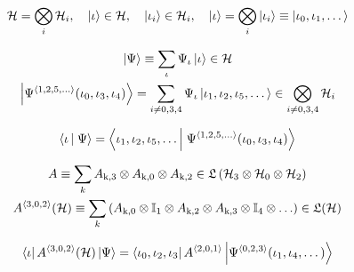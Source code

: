 \documentclass[a4paper,fleqn]{article}
\newcommand{\Lfrak}{\mathfrak{L}}
\newcommand\HSpace{{\mathcal H}}
\begin{document}
\begin{equation}
  \HSpace=\bigotimes_i\HSpace_i,\quad\ket\iota\in\HSpace,\quad\ket{\iota_i}\in\HSpace_i,
  \quad\ket\iota=\bigotimes_i\ket{\iota_i}\equiv\ket{\iota_0,\iota_1,\dots}
\end{equation}

\newpage

\begin{multline}
\ket\Psi\equiv\sum_\iota\Psi_\iota\ket\iota\in\HSpace\\
\ket{\Psi^{\avr{1,2,5,\dots}}(\iota_0,\iota_3,\iota_4)}=
\sum_{i\neq0,3,4}\Psi_{\iota}\ket{\iota_1,\iota_2,\iota_5,\dots}\in\bigotimes_{i\neq0,3,4}\HSpace_i
\end{multline}

\newpage

\begin{equation}
\braket\iota\Psi=\braket{\iota_1,\iota_2,\iota_5,\dots}{\Psi^{\avr{1,2,5,\dots}}(\iota_0,\iota_3,\iota_4)}
\end{equation}

\newpage

\begin{multline}
A\equiv\sum_kA_\text{k,3}\otimes A_\text{k,0}\otimes A_\text{k,2}
\in\Lfrak\lp\HSpace_\text{3}\otimes\HSpace_\text{0}\otimes\HSpace_\text{2}\rp\\
A^{\avr{3,0,2}}(\HSpace)\equiv
\sum_k\lp A_\text{k,0}\otimes\idop_1\otimes A_\text{k,2}\otimes A_\text{k,3}\otimes\idop_4\otimes\dots\rp
\in\Lfrak(\HSpace)
\end{multline}

\newpage

\begin{equation}
\bra\iota A^{\avr{3,0,2}}(\HSpace)\ket\Psi=\bra{\iota_0,\iota_2,\iota_3}A^{\avr{2,0,1}}\ket{\Psi^{\avr{0,2,3}}(\iota_1,\iota_4,\dots)}
\end{equation}
\end{document}
